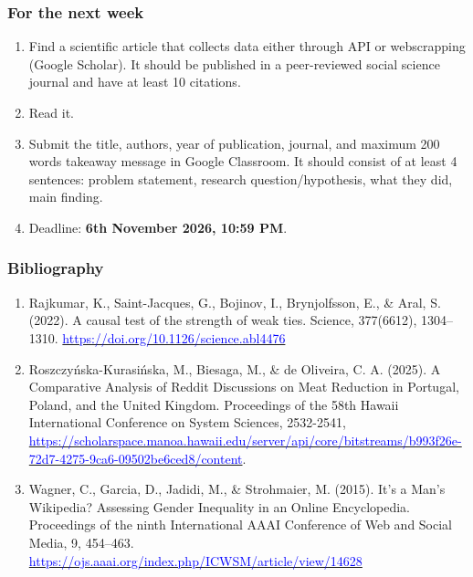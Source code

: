 \documentclass[aspectratio=169]{beamer}
\begin{document}
\begin{frame}
    \frametitle{For the next week}
    \begin{enumerate}
        \item Find a scientific article that collects data either through API or webscrapping (Google Scholar). It should be published in a peer-reviewed social science journal and have at least 10 citations.
        \item Read it.
        \item Submit the title, authors, year of publication, journal, and maximum 200 words takeaway message in Google Classroom. It should consist of at least 4 sentences: problem statement, research question/hypothesis, what they did, main finding.
        \item Deadline: \textbf{6th November 2026, 10:59 PM}.
    \end{enumerate}
\end{frame}

\begin{frame}
    \frametitle{Bibliography}
    \tiny
    \begin{enumerate}
        \item Rajkumar, K., Saint-Jacques, G., Bojinov, I., Brynjolfsson, E., \& Aral, S. (2022). A causal test of the strength of weak ties. Science, 377(6612), 1304–1310. \href{https://doi.org/10.1126/science.abl4476}{\textcolor{blue}{https://doi.org/10.1126/science.abl4476}}
        \item Roszczyńska-Kurasińska, M., Biesaga, M., \& de Oliveira, C. A. (2025). A Comparative Analysis of Reddit Discussions on Meat Reduction in Portugal, Poland, and the United Kingdom. Proceedings of the 58th Hawaii International Conference on System Sciences, 2532-2541, \href{https://scholarspace.manoa.hawaii.edu/server/api/core/bitstreams/b993f26e-72d7-4275-9ca6-09502be6ced8/content}{\textcolor{blue}{https://scholarspace.manoa.hawaii.edu/server/api/core/bitstreams/b993f26e-72d7-4275-9ca6-09502be6ced8/content}}.
        \item Wagner, C., Garcia, D., Jadidi, M., \& Strohmaier, M. (2015). It’s a Man’s Wikipedia? Assessing Gender Inequality in an Online Encyclopedia. Proceedings of the ninth International AAAI Conference of Web and Social Media, 9, 454–463. \href{https://ojs.aaai.org/index.php/ICWSM/article/view/14628}{\textcolor{blue}{https://ojs.aaai.org/index.php/ICWSM/article/view/14628}}
    \end{enumerate}
    
\end{frame}
\end{document}
